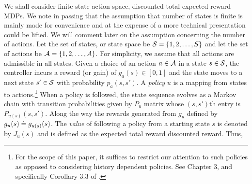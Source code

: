 \documentclass[12pt,draftcls,onecolumn]{IEEEtran}
\begin{document}
We shall consider finite state-action space, discounted total expected reward MDPs.
We note in passing that the assumption that number of states is finite is mainly made for convenience and at the expense of a more technical presentation could be lifted. We will comment later on the assumption concerning the number of actions.
Let the set of states, or state space be $\S = \{1,2,\dots,S\}$ and let the set of actions be $\A = \{1,2,\dots,A\}$.
For simplicity, we assume that all actions are admissible in all states.
Given a choice of an action $a\in \A$ in a state $s\in \S$, the controller incurs a reward (or gain) of $g_a(s)\in [0,1]$
and the state moves to a next state $s'\in \S$ with probability $p_{a}(s,s')$.
A \emph{policy} $u$ is a mapping from states to actions.\footnote{For the scope of this paper, it suffices to restrict our attention to such policies as opposed to considering history dependent policies. See Chapter 3, and specifically Corollary 3.3 of \cite{Kall17}.}
When a policy is followed, the state sequence evolves as a Markov chain with transition probabilities given by $P_u$ matrix whose $(s,s')$th entry is $P_{u(s)}(s,s')$. Along the way the rewards generated from $g_u$ defined by $g_u(s) \defeq g_{u(s)}(s)$.
The \emph{value} of following a policy from a starting state $s$ is denoted by $J_u(s)$ and is defined as
the expected total reward discounted reward. Thus,

\end{document}
